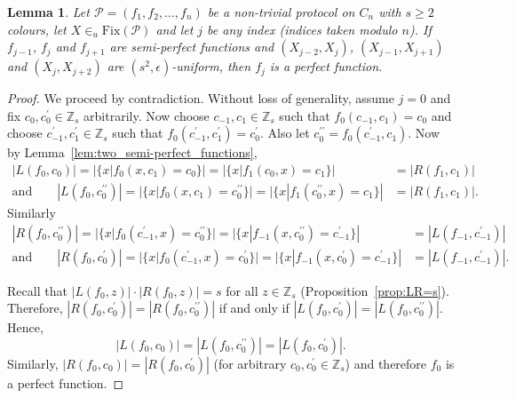 \documentclass{birkjour}
\newtheorem{lem}[thm]{Lemma}
\theoremstyle{indenteddefinition}
\theoremstyle{indenteddefinition}
\numberwithin{equation}{section}
\renewcommand{\Pr}{\mathcal{P}}
\newcommand{\Z}{\mathbb{Z}}
\newcommand{\Fix}{\mbox{Fix}}
\begin{document}
\begin{lem}
\label{lem:three_semi-perfect_functions}
Let $\Pr = (f_1,f_2, \ldots ,f_n)$ be a non-trivial protocol on $C_n$ with $s \geq 2$ colours, let $X \in_u \Fix(\Pr)$ and let $j$ be any index (indices taken modulo $n$). If $f_{j-1}$, $f_j$ and $f_{j+1}$ are semi-perfect functions and $(X_{j-2},X_j)$, $(X_{j-1},X_{j+1})$ and $(X_j,X_{j+2})$ are $(s^2,\epsilon)$-uniform, then $f_j$ is a perfect function.
\end{lem}
\begin{proof} We proceed by contradiction.
Without loss of generality, assume $j=0$ and fix $c_0,c_0^\prime \in \Z_s$ arbitrarily. Now choose $c_{-1},c_1\in \Z_s$ such that $f_0(c_{-1},c_1)=c_0$ and choose $c_{-1}^\prime,c_1^\prime \in \Z_s$ such that $f_0(c_{-1}^\prime ,c_1^\prime)=c_0^\prime$. Also let $c_0^{\prime\prime} = f_0(c_{-1}^\prime ,c_1)$. Now by Lemma~\ref{lem:two_semi-perfect_functions},
	\begin{align*}
	|L(f_0,c_0)| = | \{ x | f_0(x,c_1)=c_0 \} | = | \{ x | f_1(c_0,x)=c_1 \} | & = |R(f_1,c_1)| \\ \mbox{and} \qquad
	|L(f_0,c_0^{\prime\prime})| = | \{ x | f_0(x,c_1)=c_0^{\prime\prime} \} | = | \{ x | f_1(c_0^{\prime\prime},x)=c_1 \} | & = |R(f_1,c_1)|. 
	\end{align*}
Similarly
	\begin{align*}
	|R(f_0,c_0^{\prime\prime})| = | \{ x | f_0(c_{-1}^{\prime},x)=c_0^{\prime\prime} \} | = | \{ x | f_{-1}(x,c_0^{\prime\prime})=c_{-1}^{\prime} \} | & = |L(f_{-1},c_{-1}^{\prime})| \\ \mbox{and} \qquad
	|R(f_0,c_0^{\prime})| = | \{ x | f_0(c_{-1}^{\prime},x)=c_0^{\prime} \} | = | \{ x | f_{-1}(x,c_0^{\prime})=c_{-1}^{\prime} \} | & = |L(f_{-1},c_{-1}^{\prime})|.
	\end{align*} 

Recall that $|L(f_0,z)|\cdot |R(f_0,z)|=s$ for all $z\in \Z_s$ (Proposition~\ref{prop:LR=s}). Therefore, $|R(f_0,c_0^{\prime})|=|R(f_0,c_0^{\prime\prime})|$ if and only if $|L(f_0,c_0^{\prime})|=|L(f_0,c_0^{\prime\prime})|$. Hence, 
	$$ |L(f_0,c_0)| = |L(f_0,c_0^{\prime\prime})| = |L(f_0,c_0^{\prime})|. $$
Similarly, $|R(f_0,c_0)| = |R(f_0,c_0^\prime)|$ (for arbitrary $c_0,c_0^\prime \in \Z_s$) and therefore $f_0$ is a perfect function.
\end{proof}
\end{document}
